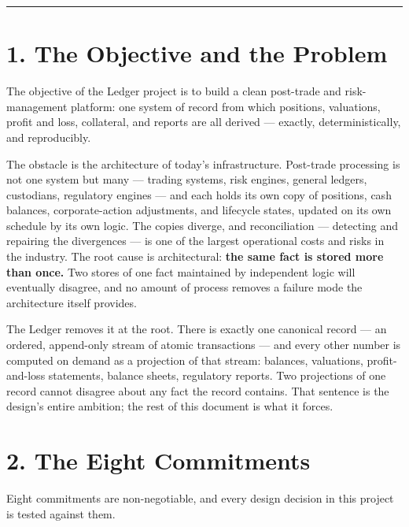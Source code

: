 \documentclass[11pt,a4paper]{article}
\newcommand{\clabel}[1]{\leavevmode\hypertarget{clause-#1}{}%
  \marginpar{\raggedright\scriptsize\ttfamily\textcolor{gray}{#1}}}
\begin{document}
\vspace{0.6em}
\begin{center}\rule{0.35\linewidth}{0.4pt}\end{center}
\vspace{0.6em}

\hypertarget{the-objective-and-the-problem}{%
\section{1. The Objective and the
Problem}\label{the-objective-and-the-problem}}

\clabel{C-1.1}The objective of the Ledger project is to build a clean post-trade and
risk-management platform: one system of record from which positions,
valuations, profit and loss, collateral, and reports are all derived ---
exactly, deterministically, and reproducibly.

The obstacle is the architecture of today's infrastructure. Post-trade
processing is not one system but many --- trading systems, risk engines,
general ledgers, custodians, regulatory engines --- and each holds its
own copy of positions, cash balances, corporate-action adjustments, and
lifecycle states, updated on its own schedule by its own logic. The
copies diverge, and reconciliation --- detecting and repairing the
divergences --- is one of the largest operational costs and risks in the
industry. \clabel{C-1.2}The root cause is architectural: \textbf{the same fact is
stored more than once.} \clabel{C-1.3}Two stores of one fact maintained by independent
logic will eventually disagree, and no amount of process removes a
failure mode the architecture itself provides.

The Ledger removes it at the root. \clabel{C-1.4}There is exactly one canonical record
--- an ordered, append-only stream of atomic transactions --- and every
other number is computed on demand as a projection of that stream:
balances, valuations, profit-and-loss statements, balance sheets,
regulatory reports. \clabel{C-1.5}Two projections of one record cannot disagree about
any fact the record contains. That sentence is the design's entire
ambition; the rest of this document is what it forces.

\hypertarget{the-eight-commitments}{%
\section{2. The Eight Commitments}\label{the-eight-commitments}}

Eight commitments are non-negotiable, and every design decision in this
project is tested against them.
\end{document}
